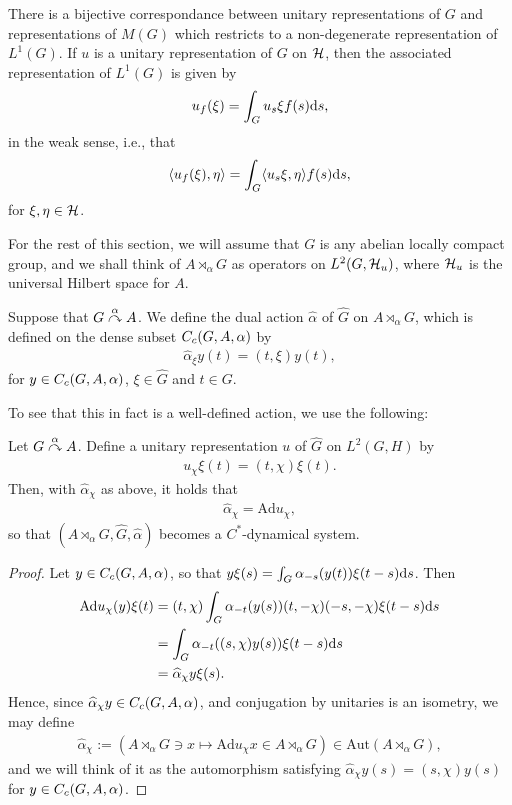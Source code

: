 \begin{proposition}
There is a bijective correspondance between unitary representations of $G$ and representations of $M(G)$ which restricts to a non-degenerate representation of $L^1(G)$. If $u$ is a unitary representation of $G$ on $\mathcal{H}$, then the associated representation of $L^1(G)$ is given by
\begin{align*}
	u_f(\xi) = \int_G u_s \xi f(s) \mathrm{d} s,
\end{align*}
in the weak sense, i.e., that 
\begin{align*}
	\langle u_f(\xi), \eta \rangle = \int_G \langle u_s \xi, \eta \rangle f(s) \mathrm{d} s,
\end{align*}
for $\xi, \eta \in \mathcal{H}$.
\end{proposition}

For the rest of this section, we will assume that $G$ is any abelian locally compact group, and we shall think of $A \rtimes_\alpha G$ as operators on $L^2(G,\mathcal{H}_u)$, where $\mathcal{H}_u$ is the universal Hilbert space for $A$.
\begin{definition}
Suppose that $G \stackrel{\alpha}{\curvearrowright} A$. We define the dual action $\hat \alpha$ of $\hat G$ on $A \rtimes_\alpha G$, which is defined on the dense subset $C_c(G,A,\alpha)$ by
\begin{align*}
	\hat \alpha_\xi y(t) =  (t,\xi) y(t),
\end{align*}
for $y \in C_c(G,A,\alpha)$, $\xi \in \hat G$ and $t \in G$.
\end{definition}
To see that this in fact is a well-defined action, we use the following:
\begin{lemma}
Let $G \stackrel{\alpha}{\curvearrowright} A$. Define a unitary representation $u$ of $\hat G$ on $L^2(G,H)$ by
\begin{align*}
	u_\chi \xi(t) = (t, \chi) \xi(t).
\end{align*}
Then, with $\hat \alpha_\chi$ as above, it holds that
\begin{align*}
	\hat \alpha_\chi = \mathrm{Ad} u_\chi,
\end{align*}
so that $(A \rtimes_\alpha G, \hat G, \hat \alpha)$ becomes a $C^*$-dynamical system.
\label{dualaction}
\end{lemma}
\begin{proof}
Let $y \in C_c(G,A,\alpha)$, so that $y \xi(s) = \int_G \alpha_{-s}(y(t))\xi(t-s) \mathrm{d} s$. Then
\begin{align*}
	\mathrm{Ad} u_{\chi}(y) \xi(t) &= (t, \chi) \int_G \alpha_{-t}(y(s)) (t, - \chi)(-s,-\chi) \xi(t-s) \mathrm{d} s\\
	&= \int_G \alpha_{-t}( (s,\chi) y(s)) \xi(t-s) \mathrm{d} s \\
	&= \widehat{\alpha}_{\chi}y \xi(s).
\end{align*}
Hence, since $\widehat{\alpha}_\chi y \in C_c(G,A,\alpha)$, and conjugation by unitaries is an isometry, we may define 
\begin{align*}
	\hat \alpha_\chi := (A \rtimes_\alpha G \ni x \mapsto \mathrm{Ad} u_\chi x \in A \rtimes_\alpha G) \in \mathrm{Aut}(A \rtimes_\alpha G),
\end{align*}
and we will think of it as the automorphism satisfying $\hat \alpha_\chi y(s) = (s,\chi) y(s)$ for $y \in C_c(G,A,\alpha)$.
\end{proof}
